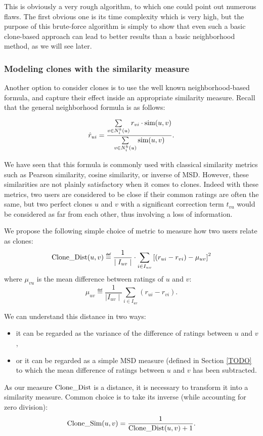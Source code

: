 This is obviously a very rough algorithm, to which one could point out numerous
flaws. The first obvious one is its time complexity which is very high, but the
purpose of this brute-force algorithm is simply to show that even such a basic
clone-based approach can lead to better results than a basic neighborhood
method, as we will see later.

\subsubsection{Modeling clones with the similarity measure}
Another option to consider clones is to use the well known neighborhood-based
formula, and capture their effect inside an appropriate similarity measure.
Recall that the general neighborhood formula is as follows:

$$\hat{r}_{ui} = \frac{\sum\limits_{v \in N_i^k(u)} r_{vi} \cdot \text{sim}(u, v)}
{\sum\limits_{v \in N_i^k(u)}\text{sim}(u, v)}.$$

We have seen that this formula is commonly used with classical similarity
metrics such as Pearson similarity, cosine similarity, or inverse of MSD.
However, these similarities are not plainly satisfactory when it comes to
clones. Indeed with these metrics, two users are considered to be close if
their common ratings are often the same, but two perfect clones $u$ and $v$
with a significant correction term $t_{vu}$ would be considered as far from
each other, thus involving a loss of information.

We propose the following simple choice of metric to measure how two users
relate as clones:
$$\clonedist(u, v) \eqdef  \frac{1}{\mid I_{uv} \mid} \cdot
\sum\limits_{i \in I_{uv}} \left[(r_{ui} - r_{vi}) - \mu_{uv}\right]^2$$
where $\mu_{vu}$ is the mean difference between ratings of $u$ and $v$:
$$\mu_{uv} \eqdef \frac{1}{\mid I_{uv}\mid}\sum_{i \in I_{uv}} (r_{ui} -
r_{vi}).$$

We can understand this distance in two ways:
\begin{itemize}
\item it can be regarded as the variance of the difference of ratings between
  $u$ and $v$,
\item or it can be regarded as a simple MSD measure (defined in Section
  \ref{TODO} to which the mean difference of ratings between $u$ and $v$ has
    been subtracted.
  \end{itemize}

As our measure $\text{Clone\_Dist}$ is a distance, it is necessary to transform it into
a similarity measure. Common choice is to take its inverse (while accounting
for zero division):
$$\text{Clone\_Sim}(u, v) = \frac{1}{\text{Clone\_Dist}(u, v) + 1}.$$

